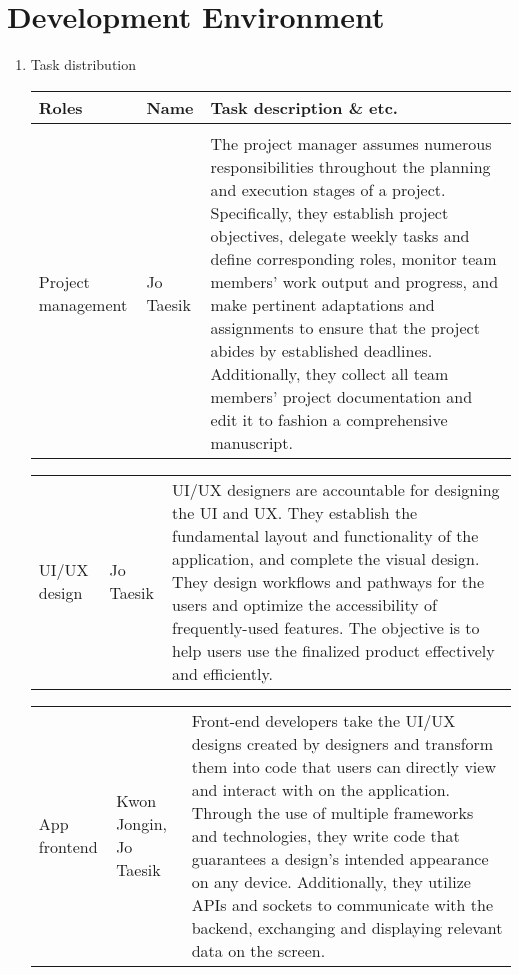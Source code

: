 \section{\Large{Development Environment}}
\begin{enumerate}[label=\arabic*]
    \item {\large{Task distribution}}
    \begin{table}[H]
    \center
    \begin{tabular}{m{1.4cm} m{1.5cm} m{4cm}}
    \toprule
    Roles & Name & Task description \& etc.\\
    \midrule
    \\
    Project management & Jo Taesik & The project manager assumes numerous responsibilities throughout the planning and execution stages of a project. Specifically, they establish project objectives, delegate weekly tasks and define corresponding roles, monitor team members' work output and progress, and make pertinent adaptations and assignments to ensure that the project abides by established deadlines. Additionally, they collect all team members' project documentation and edit it to fashion a comprehensive manuscript. \\
    \end{tabular}
    \end{table}
    
    \begin{table}[H]
    \center
    \begin{tabular}{m{1.4cm} m{1.5cm} m{4cm}}
    UI/UX design & Jo Taesik & UI/UX designers are accountable for designing the UI and UX. They establish the fundamental layout and functionality of the application, and complete the visual design. They design workflows and pathways for the users and optimize the accessibility of frequently-used features. The objective is to help users use the finalized product effectively and efficiently. \\
    \end{tabular}
    \end{table}

    \begin{table}[H]
    \center
    \begin{tabular}{m{1.4cm} m{1.5cm} m{4cm}}
    App frontend & Kwon Jongin, Jo Taesik & Front-end developers take the UI/UX designs created by designers and transform them into code that users can directly view and interact with on the application. Through the use of multiple frameworks and technologies, they write code that guarantees a design’s intended appearance on any device. Additionally, they utilize APIs and sockets to communicate with the backend, exchanging and displaying relevant data on the screen. \\
    \end{tabular}
    \end{table}


\end{enumerate}
